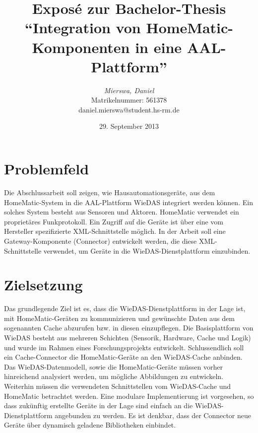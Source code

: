 \documentclass[a4paper,11pt]{article}
\title{
	\textbf{Exposé zur Bachelor-Thesis ``Integration von HomeMatic-Komponenten in eine AAL-Plattform''}
}
\author{
	\textit{Mierswa, Daniel} \\
	Matrikelnummer: 561378 \\
	daniel.mierswa@student.hs-rm.de \\
}
\date{29. September 2013}
\begin{document}
\maketitle

\section{Problemfeld}
Die Abschlussarbeit soll zeigen, wie Hausautomationsgeräte, aus dem HomeMatic-System in die
AAL-Plattform WieDAS integriert werden können.
Ein solches System besteht aus Sensoren und Aktoren.
HomeMatic verwendet ein proprietäres Funkprotokoll.
Ein Zugriff auf die Geräte ist über eine vom Hersteller spezifizierte XML-Schnittstelle möglich.
In der Arbeit soll eine Gateway-Komponente (Connector) entwickelt werden, die diese XML-Schnittstelle
verwendet, um Geräte in die WieDAS-Dienstplattform einzubinden.

\section{Zielsetzung}
Das grundlegende Ziel ist es, dass die WieDAS-Dienstplattform in der Lage ist, mit HomeMatic-Geräten zu
kommunizieren und gewünschte Daten aus dem sogenannten Cache abzurufen bzw. in diesen einzupflegen.
Die Basisplattform von WieDAS besteht aus mehreren Schichten (Sensorik, Hardware, Cache und Logik) und
wurde im Rahmen eines Forschungsprojekts entwickelt.
Schlussendlich soll ein Cache-Connector die HomeMatic-Geräte an den WieDAS-Cache anbinden.
Das WieDAS-Datenmodell, sowie die HomeMatic-Geräte müssen vorher hinreichend analysiert werden, um mögliche
Abbildungen zu entwickeln.
Weiterhin müssen die verwendeten Schnittstellen vom WieDAS-Cache und HomeMatic betrachtet werden.
Eine modulare  Implementierung ist vorgesehen, so dass zukünftig erstellte Geräte in der Lage sind einfach
an die WieDAS-Dienstplattform angebunden zu werden.
Es ist denkbar, dass der Connector neue Geräte über dynamisch geladene Bibliotheken einbindet.
\end{document}
